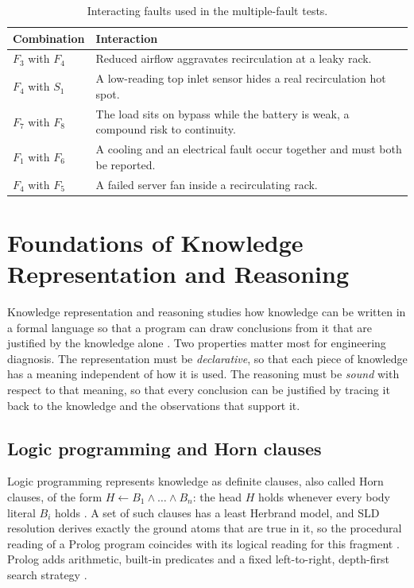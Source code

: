 \begin{table}[htbp]
  \centering
  \small
  \caption{Interacting faults used in the multiple-fault tests.}
  \label{tab:interactions}
  \begin{tabular}{L{3.2cm}L{10.8cm}}
    \toprule
    Combination & Interaction \\
    \midrule
    $F_3$ with $F_4$ & Reduced airflow aggravates recirculation at a leaky rack. \\
    $F_4$ with $S_1$ & A low-reading top inlet sensor hides a real recirculation hot spot. \\
    $F_7$ with $F_8$ & The load sits on bypass while the battery is weak, a compound risk to continuity. \\
    $F_1$ with $F_6$ & A cooling and an electrical fault occur together and must both be reported. \\
    $F_4$ with $F_5$ & A failed server fan inside a recirculating rack. \\
    \bottomrule
  \end{tabular}
\end{table}

\section{Foundations of Knowledge Representation and Reasoning}
\label{sec:krr}

Knowledge representation and reasoning studies how knowledge can be written in a formal language so that a program can draw conclusions from it that are justified by the knowledge alone \parencite{brachman2004}. Two properties matter most for engineering diagnosis. The representation must be \emph{declarative}, so that each piece of knowledge has a meaning independent of how it is used. The reasoning must be \emph{sound} with respect to that meaning, so that every conclusion can be justified by tracing it back to the knowledge and the observations that support it.

\subsection{Logic programming and Horn clauses}

Logic programming represents knowledge as definite clauses, also called Horn clauses, of the form $H \leftarrow B_1 \wedge \dots \wedge B_n$: the head $H$ holds whenever every body literal $B_i$ holds \parencite{kowalski1979,lloyd1987}. A set of such clauses has a least Herbrand model, and SLD resolution derives exactly the ground atoms that are true in it, so the procedural reading of a Prolog program coincides with its logical reading for this fragment \parencite{lloyd1987}. Prolog adds arithmetic, built-in predicates and a fixed left-to-right, depth-first search strategy \parencite{bratko2012}.

